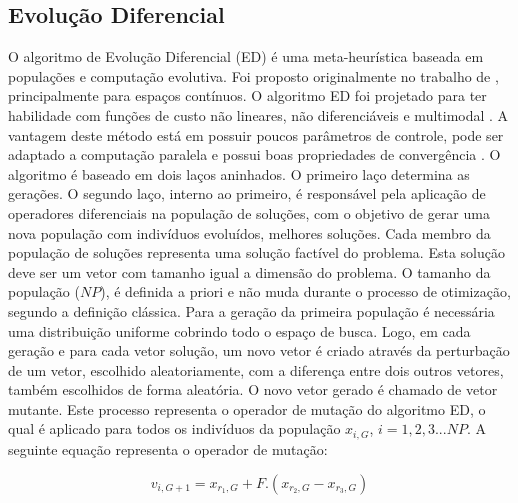 \documentclass[12pt,A4,A4pt]{article}
\begin{document}


\subsection{Evolução Diferencial}
\label{ed}
\hspace{0.5cm}O algoritmo de Evolução Diferencial (ED) é uma meta-heurística baseada em populações e computação evolutiva. Foi proposto originalmente no trabalho de \cite{Storn1997}, principalmente para espaços contínuos. O algoritmo ED foi projetado para ter habilidade com funções de custo não lineares, não diferenciáveis e multimodal \citep{Storn1997}. A vantagem deste método está em possuir poucos parâmetros de controle, pode ser adaptado a computação paralela e possui boas propriedades de convergência \citep{Storn1997}. O algoritmo é baseado em dois laços aninhados. O primeiro laço determina as gerações. O segundo laço, interno ao primeiro, é responsável pela aplicação de operadores diferenciais na população de soluções, com o objetivo de gerar uma nova população com indivíduos evoluídos, melhores soluções. Cada membro da população de soluções representa uma solução factível do problema. Esta solução deve ser um vetor com tamanho igual a dimensão do problema. O tamanho da população ($NP$), é definida a priori e não muda durante o processo de otimização, segundo a definição clássica. Para a geração da primeira população é necessária uma distribuição uniforme cobrindo todo o espaço de busca. Logo, em cada geração e para cada vetor solução, um novo vetor é criado através da perturbação de um vetor, escolhido aleatoriamente, com a diferença entre dois outros vetores, também escolhidos de forma aleatória. O novo vetor gerado é chamado de vetor mutante. Este processo representa o operador de mutação do algoritmo ED, o qual é aplicado para todos os indivíduos da população $x_{i,G}$, $i = 1,2,3...NP$. A seguinte equação representa o operador de mutação:

\begin{equation}
v_{i,G+1} = x_{r_{1},G} + F . (x_{r_{2},G} - x_{r_{3},G}) \label{trial}
\end{equation}
\end{document}
